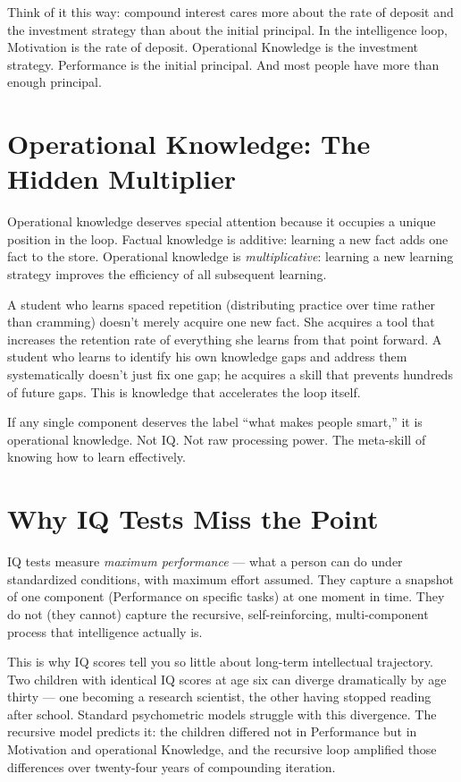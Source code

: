 \documentclass[11pt, twoside, openright]{book}
\begin{document}
Think of it this way: compound interest cares more about the rate of deposit and the investment strategy than about the initial principal. In the intelligence loop, Motivation is the rate of deposit. Operational Knowledge is the investment strategy. Performance is the initial principal. And most people have more than enough principal.

\section*{Operational Knowledge: The Hidden Multiplier}

Operational knowledge deserves special attention because it occupies a unique position in the loop. Factual knowledge is additive: learning a new fact adds one fact to the store. Operational knowledge is \textit{multiplicative}: learning a new learning strategy improves the efficiency of all subsequent learning.

A student who learns spaced repetition (distributing practice over time rather than cramming) doesn't merely acquire one new fact. She acquires a tool that increases the retention rate of everything she learns from that point forward. A student who learns to identify his own knowledge gaps and address them systematically doesn't just fix one gap; he acquires a skill that prevents hundreds of future gaps. This is knowledge that accelerates the loop itself.

If any single component deserves the label ``what makes people smart,'' it is operational knowledge. Not IQ. Not raw processing power. The meta-skill of knowing how to learn effectively.

\section*{Why IQ Tests Miss the Point}

IQ tests measure \textit{maximum performance} --- what a person can do under standardized conditions, with maximum effort assumed. They capture a snapshot of one component (Performance on specific tasks) at one moment in time. They do not (they cannot) capture the recursive, self-reinforcing, multi-component process that intelligence actually is.

This is why IQ scores tell you so little about long-term intellectual trajectory. Two children with identical IQ scores at age six can diverge dramatically by age thirty --- one becoming a research scientist, the other having stopped reading after school. Standard psychometric models struggle with this divergence. The recursive model predicts it: the children differed not in Performance but in Motivation and operational Knowledge, and the recursive loop amplified those differences over twenty-four years of compounding iteration.
\end{document}
